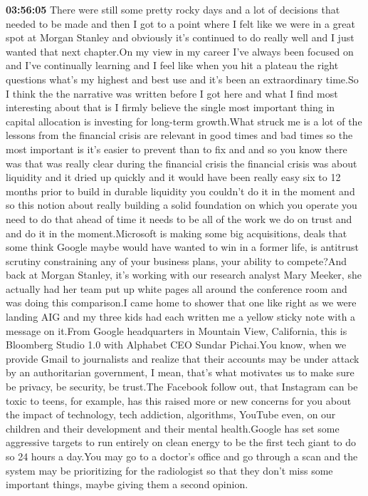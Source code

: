 \documentclass{article}%
\begin{document}
\textbf{03:56:05}%
\newline%
There were still some pretty rocky days and a lot of decisions that needed to be made and then I got to a point where I felt like we were in a great spot at Morgan Stanley and obviously it's continued to do really well and I just wanted that next chapter.On my view in my career I've always been focused on and I've continually learning and I feel like when you hit a plateau the right questions what's my highest and best use and it's been an extraordinary time.So I think the the narrative was written before I got here and what I find most interesting about that is I firmly believe the single most important thing in capital allocation is investing for long{-}term growth.What struck me is a lot of the lessons from the financial crisis are relevant in good times and bad times so the most important is it's easier to prevent than to fix and and so you know there was that was really clear during the financial crisis the financial crisis was about liquidity and it dried up quickly and it would have been really easy six to 12 months prior to build in durable liquidity you couldn't do it in the moment and so this notion about really building a solid foundation on which you operate you need to do that ahead of time it needs to be all of the work we do on trust and  and do it in the moment.Microsoft is making some big acquisitions, deals that some think Google maybe would have wanted to win in a former life, is antitrust scrutiny constraining any of your business plans, your ability to compete?And back at Morgan Stanley, it's working with our research analyst Mary Meeker, she actually had her team put up white pages all around the conference room and was doing this comparison.I came home to shower that one like right as we were landing AIG and my three kids had each written me a yellow sticky note with a message on it.From Google headquarters in Mountain View, California, this is Bloomberg Studio 1.0 with Alphabet CEO Sundar Pichai.You know, when we provide Gmail to journalists and realize that their accounts may be under attack by an authoritarian government, I mean, that's what motivates us to make sure be privacy, be security, be trust.The Facebook follow out, that Instagram can be toxic to teens, for example, has this raised more or new concerns for you about the impact of technology, tech addiction, algorithms, YouTube even, on our children and their development and their mental health.Google has set some aggressive targets to run entirely on clean energy to be the first tech giant to do so 24 hours a day.You may go to a doctor's office and go through a scan and the system may be prioritizing for the radiologist so that they don't miss some important things, maybe giving them a second opinion.%
\end{document}

